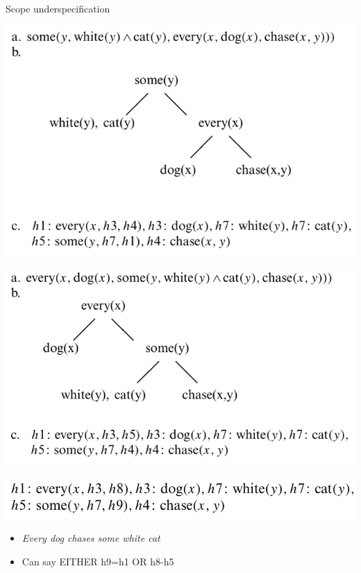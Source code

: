 \documentclass{beamer}
\begin{document}
\begin{frame}{Scope underspecification}
  \begin{minipage}{0.45\textwidth}
    \includegraphics[height=0.4\textheight,width=\linewidth]{figures/scope1}
  \end{minipage}
  \begin{minipage}{0.45\textwidth}
    \includegraphics[height=0.4\textheight,width=\linewidth]{figures/scope2}
  \end{minipage}

  \includegraphics[width=\textwidth]{figures/scope3}

  \begin{itemize}
  \item {\it Every dog chases some white cat}
  \item Can say EITHER h9=h1 OR h8-h5
\end{itemize}
\end{frame}
\end{document}
